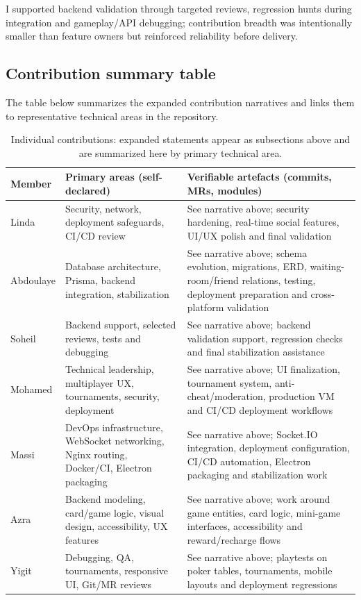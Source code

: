 \documentclass[11pt,a4paper]{article}
\begin{document}
I supported backend validation through targeted reviews, regression hunts during integration and gameplay/API debugging; contribution breadth was intentionally smaller than feature owners but reinforced reliability before delivery.

\subsection{Contribution summary table}

The table below summarizes the expanded contribution narratives and links them to representative technical areas in the repository.

\begin{table}[htbp]
\centering
\small
\begin{tabular}{@{}p{2.6cm}p{4.6cm}p{5.8cm}@{}}
\toprule
Member & Primary areas (self-declared) & Verifiable artefacts (commits, MRs, modules) \\
\midrule
Linda & Security, network, deployment safeguards, CI/CD review & See narrative above; security hardening, real-time social features, UI/UX polish and final validation \\
Abdoulaye & Database architecture, Prisma, backend integration, stabilization & See narrative above; schema evolution, migrations, ERD, waiting-room/friend relations, testing, deployment preparation and cross-platform validation \\
Soheil & Backend support, selected reviews, tests and debugging & See narrative above; backend validation support, regression checks and final stabilization assistance \\
Mohamed & Technical leadership, multiplayer UX, tournaments, security, deployment & See narrative above; UI finalization, tournament system, anti-cheat/moderation, production VM and CI/CD deployment workflows \\
Massi & DevOps infrastructure, WebSocket networking, Nginx routing, Docker/CI, Electron packaging & See narrative above; Socket.IO integration, deployment configuration, CI/CD automation, Electron packaging and stabilization work \\
Azra & Backend modeling, card/game logic, visual design, accessibility, UX features & See narrative above; work around game entities, card logic, mini-game interfaces, accessibility and reward/recharge flows \\
Yigit & Debugging, QA, tournaments, responsive UI, Git/MR reviews & See narrative above; playtests on poker tables, tournaments, mobile layouts and deployment regressions \\
\bottomrule
\end{tabular}
\caption{Individual contributions: expanded statements appear as subsections above and are summarized here by primary technical area.}\label{tab:contrib}
\end{table}
\end{document}
